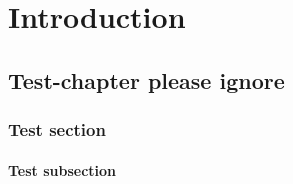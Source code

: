 \part{Introduction}
\chapter{Test-chapter please ignore}
\section{Test section}
\subsection{Test subsection}